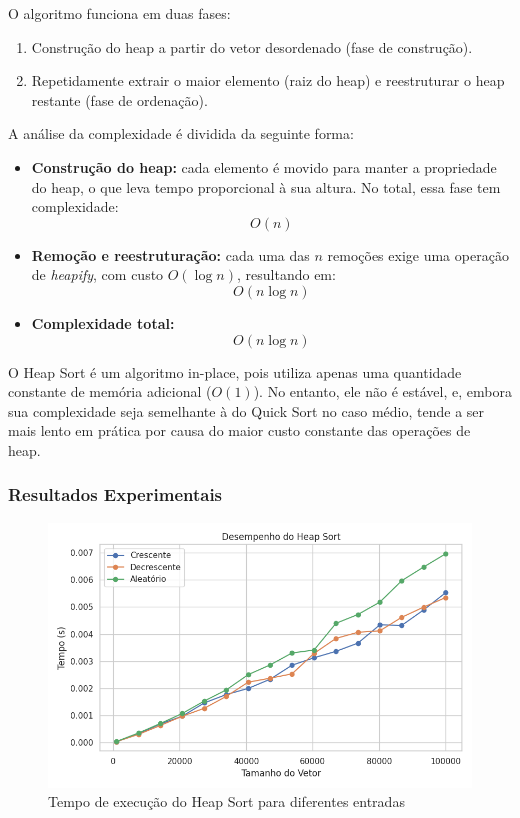 O algoritmo funciona em duas fases:

\begin{enumerate}
    \item Construção do heap a partir do vetor desordenado (fase de construção).
    \item Repetidamente extrair o maior elemento (raiz do heap) e reestruturar o heap restante (fase de ordenação).
\end{enumerate}

A análise da complexidade é dividida da seguinte forma:

\begin{itemize}
    \item \textbf{Construção do heap:} cada elemento é movido para manter a propriedade do heap, o que leva tempo proporcional à sua altura. No total, essa fase tem complexidade:
    \[
    O(n)
    \]

    \item \textbf{Remoção e reestruturação:} cada uma das \(n\) remoções exige uma operação de \textit{heapify}, com custo \(O(\log n)\), resultando em:
    \[
    O(n \log n)
    \]

    \item \textbf{Complexidade total:}
    \[
    O(n \log n)
    \]
\end{itemize}

O Heap Sort é um algoritmo in-place, pois utiliza apenas uma quantidade constante de memória adicional (\(O(1)\)). No
entanto, ele não é estável, e, embora sua complexidade seja semelhante à do Quick Sort no caso médio, tende a ser mais
lento em prática por causa do maior custo constante das operações de heap.~\cite{geeksforgeeks_heap_sort}

\subsubsection{Resultados Experimentais}
\begin{figure}[H]
    \centering
    \includegraphics[width=1\textwidth]{../codigos/resultados/heap_grafico.png}
    \caption{Tempo de execução do Heap Sort para diferentes entradas}
    \label{fig:heap-grafico}
\end{figure}

